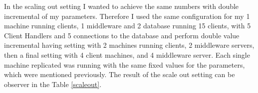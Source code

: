 \begin{table}[h]\centering
         \caption{Scalep up setting with single machine, increasing constanlty connections and client handlers}
         \label{scaleup}
 \end{table}
 In the scaling out setting I wanted to achieve the same numbers with double incremental of my parameters. Therefore I used the same configuration for my 1 machine running clients, 1 middleware and 2 database running 15 clients, with 5 Client Handlers and 5 connections to the database and perform double value incremental having setting with 2 machines running clients, 2 middleware servers, then a final setting with 4 client machines, and 4 middleware server. Each single machine replicated was running with the same fixed values for the parameters, which were mentioned previously. The result of the scale out setting can be observer in the Table \ref{scaleout}.\\
 
\begin{table}[h]\centering
         \caption{Scaling out setting with fixed paramters in connections and client handlers but constant incremental of middleware nodes and client machines}
         \label{scaleout}
 \end{table} 
 
